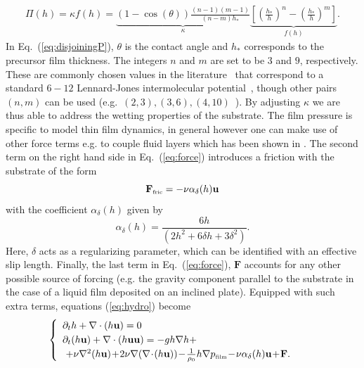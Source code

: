 \begin{eqnarray}\label{eq:disjoiningP}
\Pi(h) = \kappa f(h) = \underbrace{(1 - \cos(\theta))\frac{(n-1)(m-1)}{(n-m)h_*}}_{\kappa}\underbrace{\left[\left(\frac{h_*}{h}\right)^n -\left(\frac{h_*}{h}\right)^m\right]}_{f(h)}.
\end{eqnarray}
In Eq.~(\ref{eq:disjoiningP}), $\theta$ is the contact angle and $h_*$
corresponds to the precursor film
thickness. The integers $n$ and $m$ are set to be $3$ and $9$, respectively. These 
are commonly chosen values in the literature~\cite{moulton_lega_2013,oronLongscaleEvolutionThin1997}
that correspond to a standard $6-12$ Lennard-Jones
intermolecular potential~\cite{fischer2018existence}, though other pairs
$(n,m)$ can be used (e.g.~$(2,3), (3,6), (4,10)$~\cite{1742-6596-166-1-012009,
wilczekSlidingDropsEnsemble2017, wedershoven2014infrared}). 
By adjusting $\kappa$ we are thus able to address the wetting properties of the substrate. 
The film pressure is specific to model thin film dynamics, in general however one can make use of other force terms e.g. to couple fluid layers which has been shown in \cite{doi:10.1002/fld.2742}. The second term on the right hand side in Eq.~(\ref{eq:force}) introduces
a friction with the substrate of the form
\begin{equation}\label{eq:forcefric}
\mathbf{F}_{\mbox{\tiny{fric}}} = -\nu \alpha_{\delta}(h)\mathbf{u}
\end{equation}
with the coefficient $\alpha_{\delta}(h)$ given by
\begin{equation}\label{eq:alphafric}
\alpha_{\delta}(h) = \frac{6h}{(2 h^2 + 6 \delta h + 3 \delta^2)}.
\end{equation}
Here, $\delta$ acts as a regularizing parameter, which can 
be identified with an effective slip length. 
Finally, the last term in Eq.~(\ref{eq:force}), $\mathbf{F}$ accounts for any other possible source
of forcing (e.g. the gravity component parallel to the substrate in the case of a liquid film
deposited on an inclined plate).
Equipped with such extra terms, equations (\ref{eq:hydro}) become
\begin{equation}\label{eq:hydro2}
\begin{cases}
\begin{array}{ll}
\partial_t h + \nabla \cdot (h \mathbf{u})  = 0 & \\ 
\partial_t (h \mathbf{u}) + \nabla \cdot (h \mathbf{u}\mathbf{u}) = -gh \nabla h  +\\ 
\,\, +  \nu \nabla^2 (h\mathbf{u}) \!+\! 2\nu \nabla (\nabla\! \cdot\! (h\mathbf{u}))
\!-\!\frac{1}{\rho_0}h\nabla p_{\mbox{\tiny{film}}} \!-\! \nu \alpha_{\delta}(h) \mathbf{u}\!+\! \mathbf{F}. 
\end{array}
\end{cases}
\end{equation}
